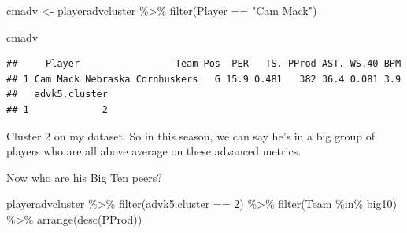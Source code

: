 \documentclass[
]{book}
\newenvironment{Shaded}{\begin{snugshade}}{\end{snugshade}}
\newcommand{\DecValTok}[1]{\textcolor[rgb]{0.00,0.00,0.81}{#1}}
\newcommand{\FunctionTok}[1]{\textcolor[rgb]{0.00,0.00,0.00}{#1}}
\newcommand{\NormalTok}[1]{#1}
\newcommand{\OtherTok}[1]{\textcolor[rgb]{0.56,0.35,0.01}{#1}}
\newcommand{\SpecialCharTok}[1]{\textcolor[rgb]{0.00,0.00,0.00}{#1}}
\newcommand{\StringTok}[1]{\textcolor[rgb]{0.31,0.60,0.02}{#1}}
\begin{document}
\begin{Shaded}
\begin{Highlighting}[]
\NormalTok{cmadv }\OtherTok{\textless{}{-}}\NormalTok{ playeradvcluster }\SpecialCharTok{\%\textgreater{}\%} \FunctionTok{filter}\NormalTok{(Player }\SpecialCharTok{==} \StringTok{"Cam Mack"}\NormalTok{)}

\NormalTok{cmadv}
\end{Highlighting}
\end{Shaded}

\begin{verbatim}
##     Player                 Team Pos  PER   TS. PProd AST. WS.40 BPM
## 1 Cam Mack Nebraska Cornhuskers   G 15.9 0.481   382 36.4 0.081 3.9
##   advk5.cluster
## 1             2
\end{verbatim}

Cluster 2 on my dataset. So in this season, we can say he's in a big group of players who are all above average on these advanced metrics.

Now who are his Big Ten peers?

\begin{Shaded}
\begin{Highlighting}[]
\NormalTok{playeradvcluster }\SpecialCharTok{\%\textgreater{}\%} 
  \FunctionTok{filter}\NormalTok{(advk5.cluster }\SpecialCharTok{==} \DecValTok{2}\NormalTok{) }\SpecialCharTok{\%\textgreater{}\%} 
  \FunctionTok{filter}\NormalTok{(Team }\SpecialCharTok{\%in\%}\NormalTok{ big10) }\SpecialCharTok{\%\textgreater{}\%} 
  \FunctionTok{arrange}\NormalTok{(}\FunctionTok{desc}\NormalTok{(PProd))}
\end{Highlighting}
\end{Shaded}
\end{document}
